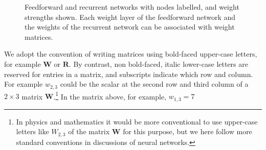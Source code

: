 \begin{figure}[h]
\centering
{}
\hspace*{.7in}
\caption[Simbrain screenshots modified by Jeff Yoshimi.]{Feedforward and recurrent networks with nodes labelled, and weight strengths shown. Each weight layer of the feedforward network and the weights of the recurrent network can be associated with weight matrices. }
\label{labelledNets}
\end{figure}

We adopt the convention of writing matrices using bold-faced upper-case letters, for example $\mathbf{W}$ or $\mathbf{R}$. By contrast, non bold-faced, italic lower-case letters are reserved for entries in a matrix, and subscripts indicate which row and column. For example $w_{2,3}$ could be the scalar at the second row and third column of a $2 \times 3$ matrix $\mathbf{W}$.\footnote{In physics and mathematics it would be more conventional to use upper-case letters like $W_{2,3}$ of the matrix $\mathbf{W}$ for this purpose, but we here follow more standard conventions in discussions of neural networks.} In the matrix above, for example, $w_{1,3} = 7 $

